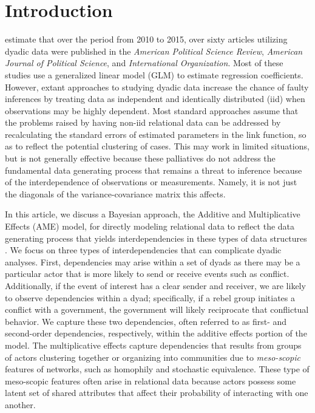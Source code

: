 \section{\textbf{Introduction}}

\citet{aronow:etal:2015} estimate that over the period from 2010 to 2015, over sixty articles utilizing dyadic data were published in the \textit{American Political Science Review}, \textit{American Journal of Political Science}, and \textit{International Organization}. Most of these studies use a generalized linear model (GLM) to estimate regression coefficients.  However, extant approaches to studying dyadic data increase the chance of faulty inferences by treating data as independent and identically distributed (iid) when observations may be highly dependent. Most standard approaches assume that the problems raised by having non-iid relational data can be addressed by recalculating the standard errors of estimated parameters in the link function, so as to reflect the potential clustering of cases. This may work in limited situations, but is not generally effective because these palliatives do not address the fundamental data generating process that remains a threat to inference because of the interdependence of observations or measurements. Namely, it is not just the diagonals of the variance-covariance matrix this affects. %

In this article, we discuss a Bayesian approach, the Additive and Multiplicative Effects (AME) model, for directly modeling relational data to reflect the data generating process that yields interdependencies in these types of data structures \citep{hoff:2008,minhas:etal:2016:arxiv}. We focus on three types of interdependencies that can complicate dyadic analyses. First, dependencies may arise within a set of dyads as there may be a particular actor that is more likely to send or receive events such as conflict. Additionally, if the event of interest has a clear sender and receiver, we are likely to observe dependencies within a dyad; specifically, if a rebel group initiates a conflict with a government, the government will likely reciprocate that conflictual behavior. We capture these two dependencies, often referred to as first- and second-order dependencies, respectively, within the additive effects portion of the model. The multiplicative effects capture dependencies that results from groups of actors clustering together or organizing into communities due to \textit{meso-scopic} features of networks, such as homophily and stochastic equivalence. These type of meso-scopic features often arise in relational data because actors possess some latent set of shared attributes that affect their probability of interacting with one another. 

